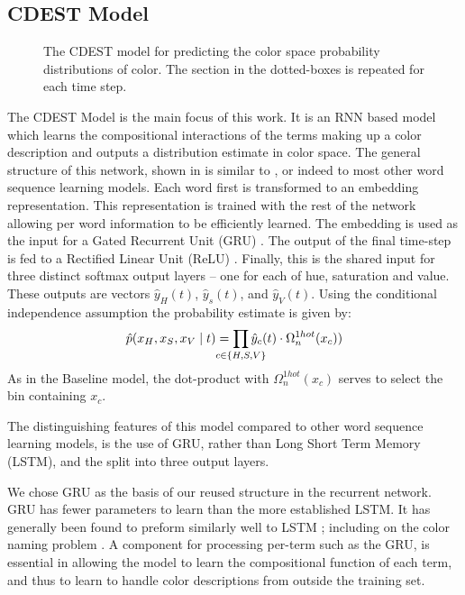 \documentclass[11pt,letterpaper]{article}
\newcommand{\parencite}{\cite}
\newcommand{\textcite}{\newcite}
\begin{document}
\subsection{CDEST Model}

\begin{figure}
	\resizebox{\columnwidth}{!}{}
	
	\caption{\label{network}
		The CDEST model for predicting the color space probability distributions of color.
		The section in the dotted-boxes is repeated for each time step.
	}
\end{figure}

The CDEST Model is the main focus of this work.
It is an RNN based model which learns the compositional interactions of the terms making up a color description and outputs a distribution estimate in color space.
The general structure of this network, shown in  is similar to \textcite{2016arXiv160603821M}, or indeed to most other word sequence learning models.
Each word first is transformed to an embedding representation.
This representation is trained with the rest of the network allowing per word information to be efficiently learned.
The embedding is used as the input for a Gated Recurrent Unit (GRU)  \parencite{cho2014properties}.
The output of the final time-step is fed to a Rectified Linear Unit (ReLU)  \parencite{dahl2013reludropout}.
Finally, this is the shared input for three distinct softmax output layers -- one for each of hue, saturation and value.
These outputs are vectors $\hat{y}_{H}(t)$, $\hat{y}_{s}(t)$, and $\hat{y}_{V}(t)$.
Using the conditional independence assumption the probability estimate is given by:
\[
	\hat{p}(x_H,x_S,x_V\mid t) = \displaystyle\prod_{
		\mathclap{c\in {\{H,S,V\}}}}
	 \hat{y}_{c}(t)\cdot \Omega_{n}^{1hot}(x_c))
\]
As in the Baseline model, the dot-product with $\Omega_{n}^{1hot}(x_c)$ serves to select the bin containing $x_c$.

The distinguishing features of this model compared to other word sequence learning models, is the use of GRU, rather than Long Short Term Memory (LSTM), and the split into three output layers.


We chose GRU as the basis of our reused structure in the recurrent network.
GRU has fewer parameters to learn than the more established LSTM.
It has generally been found to preform similarly well to LSTM \parencite{chung2014empirical};
including on the color naming problem \parencite{2016arXiv160603821M}.
A component for processing per-term such as the GRU, is essential in allowing the model to learn the compositional function of each term,  and thus to learn to handle color descriptions from outside the training set.
\end{document}
